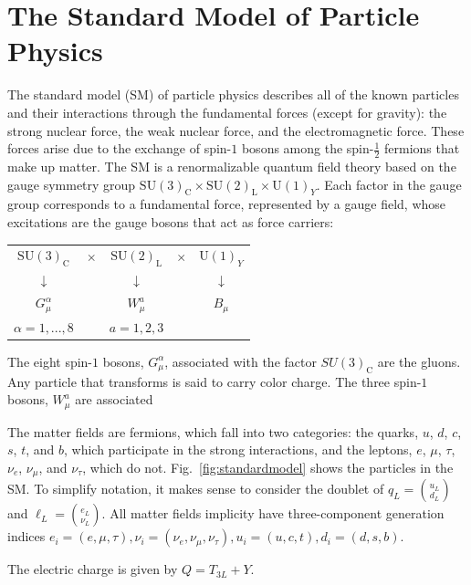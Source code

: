 \section{The Standard Model of Particle Physics}

The standard model (SM) of particle physics describes all of the known
particles and their interactions through the fundamental forces
(except for gravity): the strong nuclear force, the weak nuclear force, and the electromagnetic
force. These forces arise due to the exchange of spin-$1$
bosons among the spin-$\frac{1}{2}$ fermions that make up matter. The SM is a renormalizable quantum field
theory based on the gauge symmetry group $\mathrm{SU(3)}_{\mathrm{C}}\times \mathrm{SU(2)}_{\mathrm{L}}\times
\mathrm{U(1)}_Y$. Each factor in the gauge group corresponds to a fundamental force, represented by a gauge field, whose excitations are
the gauge bosons that act as force carriers:
\begin{center}
\begin{tabular}{ccccc}
$\mathrm{SU(3)}_{\mathrm{C}}$ &$\times$& $\mathrm{SU(2)}_{\mathrm{L}}$
  &$\times$& $\mathrm{U(1)}_Y$\\
 $\downarrow$&&$\downarrow$&&$\downarrow$\\
 $G_{\mu}^{\alpha}$&&$W^a_{\mu}$&&$B_{\mu}$\\
 $\alpha=1,...,8$&&$a=1,2,3$&&
\end{tabular}
\end{center}
The eight spin-$1$ bosons, $G_{\mu}^{\alpha}$,
associated with the factor $SU(3)_{\mathrm{C}}$ are the gluons. Any
particle that transforms is said to carry color charge. The three spin-$1$
bosons, $W^{a}_{\mu}$ are associated 

The matter fields are fermions, which fall into two
categories: the quarks, $u$, $d$, $c$, $s$, $t$, and $b$, which participate in the
strong interactions, and the leptons, $e$, $\mu$, $\tau$, $\nu_e$,
$\nu_{\mu}$, and $\nu_{\tau}$, which do
not. Fig.~\ref{fig:standardmodel} shows the particles in the SM. To simplify notation, it makes sense to consider the doublet of
$q_L = \binom{u_L}{d_L}$ and $\ell_L = \binom{e_L}{\nu_L}$. All matter fields implicity have
three-component generation indices $e_i=(e,\mu,\tau),
\nu_i=(\nu_e,\nu_{\mu},\nu_{\tau}), u_i=(u,c,t),
d_i=(d,s,b)$. 

The electric charge is given by $Q = T_{3L}+Y$.

